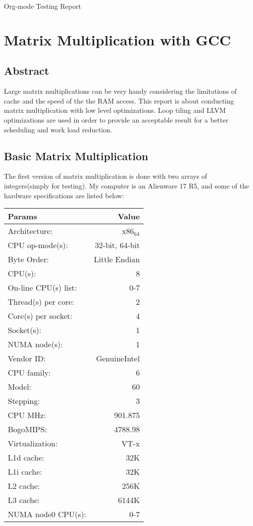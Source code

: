 \documentclass[11pt]{article}
\author{潘安}
\date{\today}
\title{}
\begin{document}
\tableofcontents

Org-mode Testing Report
\section{Matrix Multiplication with GCC}
\label{sec:orgheadline3}

\subsection{Abstract}
\label{sec:orgheadline1}
Large matrix multiplications can be very handy considering 
the limitations of cache and the speed of the the RAM access.
This report is about conducting matrix multiplication with 
low level optimizations. Loop tiling and LLVM optimizations
are used in order to provide an acceptable result for a better
scheduling and work load reduction.

\subsection{Basic Matrix Multiplication}
\label{sec:orgheadline2}
The first version of matrix multiplication is done with
 two arrays of integers(simply for testing). My computer is 
an Alienware 17 R5, and some of the hardware specifications are listed
below:
\begin{center}
\begin{tabular}{lr}
Params & Value\\
\hline
Architecture: & x86\(_{\text{64}}\)\\
CPU op-mode(s): & 32-bit, 64-bit\\
Byte Order: & Little Endian\\
CPU(s): & 8\\
On-line CPU(s) list: & 0-7\\
Thread(s) per core: & 2\\
Core(s) per socket: & 4\\
Socket(s): & 1\\
NUMA node(s): & 1\\
Vendor ID: & GenuineIntel\\
CPU family: & 6\\
Model: & 60\\
Stepping: & 3\\
CPU MHz: & 901.875\\
BogoMIPS: & 4788.98\\
Virtualization: & VT-x\\
L1d cache: & 32K\\
L1i cache: & 32K\\
L2 cache: & 256K\\
L3 cache: & 6144K\\
NUMA node0 CPU(s): & 0-7\\
\end{tabular}
\end{center}
\end{document}

